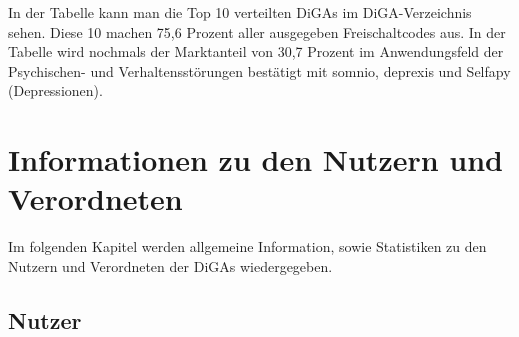 \documentclass{article}
\begin{document}
			In der Tabelle kann man die Top 10 verteilten DiGAs im DiGA-Verzeichnis sehen. Diese 10 machen 75,6 Prozent aller ausgegeben Freischaltcodes aus. In der Tabelle wird nochmals der Marktanteil von 30,7 Prozent im Anwendungsfeld der Psychischen- und Verhaltensstörungen bestätigt mit somnio, deprexis und Selfapy (Depressionen).  
	\section{Informationen zu den Nutzern und Verordneten}
		Im folgenden Kapitel werden allgemeine Information, sowie Statistiken zu den Nutzern und Verordneten der DiGAs wiedergegeben.
		\subsection{Nutzer}
			
				 


\end{document}
